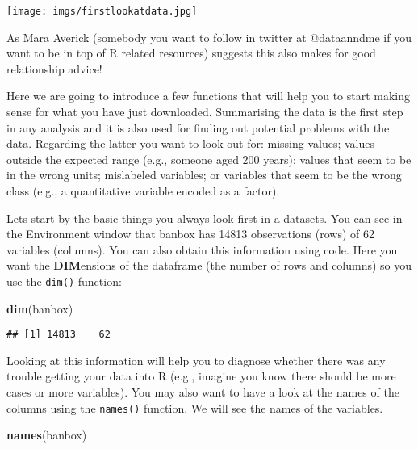 \documentclass[
]{book}
\newenvironment{Shaded}{\begin{snugshade}}{\end{snugshade}}
\newcommand{\FunctionTok}[1]{\textcolor[rgb]{0.13,0.29,0.53}{\textbf{#1}}}
\newcommand{\NormalTok}[1]{#1}
\begin{document}
\texttt{[image: imgs/firstlookatdata.jpg]}

As Mara Averick (somebody you want to follow in twitter at @dataanndme if you want to be in top of R related resources) suggests this also makes for good relationship advice!

Here we are going to introduce a few functions that will help you to start making sense for what you have just downloaded. Summarising the data is the first step in any analysis and it is also used for finding out potential problems with the data. Regarding the latter you want to look out for: missing values; values outside the expected range (e.g., someone aged 200 years); values that seem to be in the wrong units; mislabeled variables; or variables that seem to be the wrong class (e.g., a quantitative variable encoded as a factor).

Lets start by the basic things you always look first in a datasets. You can see in the Environment window that banbox has 14813 observations (rows) of 62 variables (columns). You can also obtain this information using code. Here you want the \textbf{DIM}ensions of the dataframe (the number of rows and columns) so you use the \texttt{dim()} function:

\begin{Shaded}
\begin{Highlighting}[]
\FunctionTok{dim}\NormalTok{(banbox)}
\end{Highlighting}
\end{Shaded}

\begin{verbatim}
## [1] 14813    62
\end{verbatim}

Looking at this information will help you to diagnose whether there was any trouble getting your data into R (e.g., imagine you know there should be more cases or more variables). You may also want to have a look at the names of the columns using the \texttt{names()} function. We will see the names of the variables.

\begin{Shaded}
\begin{Highlighting}[]
\FunctionTok{names}\NormalTok{(banbox)}
\end{Highlighting}
\end{Shaded}
\end{document}
